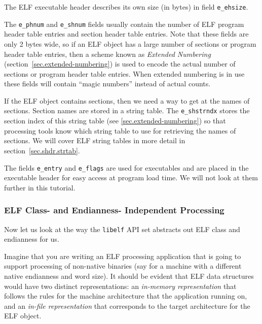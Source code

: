 \documentclass[a4paper,pdftex]{book}
\makeatletter
\newcommand{\firstterm}[1]{\textit{#1}}
\newcommand{\library}[1]{\texttt{#1}}
\newcommand{\parameter}[1]{\texttt{#1}}
\newenvironment{callout}[2][black]{%
  \begingroup\newcommand{\@cocolor}{#1}%
  \setlength{\shadowsize}{1.2pt}%
  \newcommand{\@cogroup}[1]{#2}}{\endgroup}
\newcommand{\@co}[1]{\shadowbox{\color{\@cocolor}#1}}
\newcommand{\coref}[1]{%
  \hypertarget{\@cogroup.#1.cr}{%
    \hyperlink{\@cogroup.#1.co}{\@co{#1}}}}
\makeatother
\begin{document}
\begin{callout}{ehdr}
\begin{description}
    The ELF executable header describes its own size (in bytes) in
    field \parameter{e\_ehsize}.%

  \item[\coref{6} \coref{7}] The \parameter{e\_phnum} and
    \parameter{e\_shnum} fields usually contain the number of ELF
    program header table entries and section header table entries.
    Note that these fields are only 2 bytes wide, so if an ELF object
    has a large number of sections or program header table entries,
    then a scheme known as \firstterm{Extended Numbering}%
     (section~\vref{sec.extended-numbering})
    is used to encode the actual number of sections or program header
    table entries.  When extended numbering is in use these fields
    will contain ``magic numbers'' instead of actual counts.

  \item[\coref{8}] If the ELF object contains sections, then we need a
    way to get at the names of sections.  Section names are stored in
    a string table. The \parameter{e\_shstrndx} stores the section
    index of this string table (see \vref{sec.extended-numbering}) so
    that processing tools know which string table to use for
    retrieving the names of sections.  We will cover ELF string tables
    in more detail in section~\vref{sec.shdr.strtab}.%
  \end{description}

  The fields \parameter{e\_entry} and \parameter{e\_flags} are used
  for executables and are placed in the executable header for easy
  access at program load time.  We will not look at them further in
  this tutorial.%
\end{callout}

\subsubsection{ELF Class- and Endianness- Independent Processing}
Now let us look at the way the \library{libelf} API set abstracts out
ELF class and endianness for us.

Imagine that you are writing an ELF processing application that is
going to support processing of non-native binaries (say for a machine
with a different native endianness and word size).  It should be
evident that ELF data structures would have two distinct
representations:  an
\firstterm{in-memory representation} that follows the rules for the
machine architecture that the application running on, and an
\firstterm{in-file representation} that corresponds to the target
architecture for the ELF object.
\end{document}
